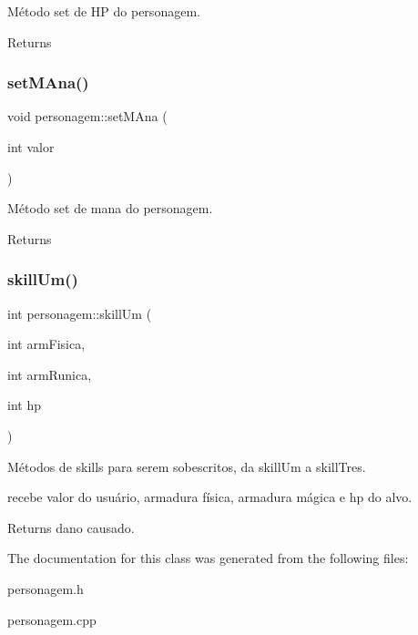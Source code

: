Método set de HP do personagem. 

\begin{DoxyReturn}{Returns}

\end{DoxyReturn}
\mbox{\label{classpersonagem_a40f2128ed721ed117a6e03c026082700}} 
\subsubsection{\texorpdfstring{set\+M\+Ana()}{setMAna()}}
{\footnotesize\ttfamily void personagem\+::set\+M\+Ana (\begin{DoxyParamCaption}\item[{int}]{valor }\end{DoxyParamCaption})}



Método set de mana do personagem. 

\begin{DoxyReturn}{Returns}

\end{DoxyReturn}
\mbox{\label{classpersonagem_a6df830166e074493fe0a25502ec24d4d}} 
\subsubsection{\texorpdfstring{skill\+Um()}{skillUm()}}
{\footnotesize\ttfamily int personagem\+::skill\+Um (\begin{DoxyParamCaption}\item[{int}]{arm\+Fisica,  }\item[{int}]{arm\+Runica,  }\item[{int}]{hp }\end{DoxyParamCaption})}



Métodos de skills para serem sobescritos, da skill\+Um a skill\+Tres. 

recebe valor do usuário, armadura física, armadura mágica e hp do alvo. \begin{DoxyReturn}{Returns}
dano causado. 
\end{DoxyReturn}


The documentation for this class was generated from the following files\+:\begin{DoxyCompactItemize}
\item 
personagem.\+h\item 
personagem.\+cpp\end{DoxyCompactItemize}
